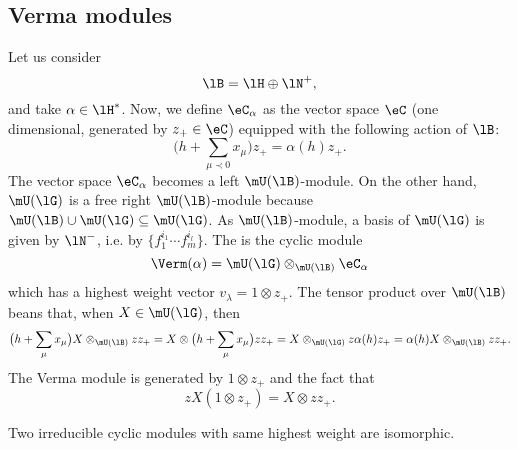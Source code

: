 \subsection{Verma modules}

Let us consider
\begin{equation}
	\lB=\lH\oplus\lN^+,
\end{equation}
and take $\alpha\in\lH^*$. Now, we define $\eC_{\alpha}$ as the vector space $\eC$ (one dimensional, generated by $z_+\in\eC$) equipped with the following action of $\lB$:
\begin{equation}
	\big( h+\sum_{\mu\prec 0}x_{\mu} \big)z_+=\alpha(h)z_+.
\end{equation}
The vector space $\eC_{\alpha}$ becomes a left $\mU(\lB)$-module. On the other hand, $\mU(\lG)$ is a free right $\mU(\lB)$-module because $\mU(\lB)\cup\mU(\lG)\subseteq\mU(\lG)$. As $\mU(\lB)$-module, a basis of $\mU(\lG)$ is given by $\lN^-$, i.e. by $\{ f_1^{i_1}\cdots f_m^{i_l} \}$. The  is the cyclic module
\begin{equation}
	\Verm(\alpha)=\mU(\lG)\otimes_{\mU(\lB)}\eC_{\alpha}
\end{equation}
which has a highest weight vector $v_{\lambda}=1\otimes z_+$. The tensor product over $\mU(\lB)$ beans that, when $X\in\mU(\lG)$, then
\begin{equation}
	\big( h+\sum_{\mu}x_{\mu} \big)X\otimes_{\mU(\lB)}zz_+=X\otimes\big( h+\sum_{\mu}x_{\mu} \big)zz_+=X\otimes_{\mU(\lG)}z\alpha(h)z_+=\alpha(h)X\otimes_{\mU(\lB)}zz_+.
\end{equation}
The Verma module is generated by $1\otimes z_+$ and the fact that
\begin{equation}
	zX(1\otimes z_+)=X\otimes zz_+.
\end{equation}

\begin{proposition}
	Two irreducible cyclic modules with same highest weight are isomorphic.
\end{proposition}

